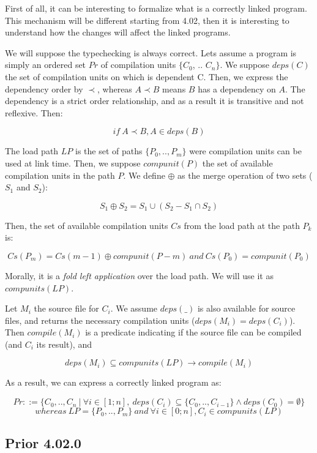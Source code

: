 \documentclass[11pt,a4paper]{article}
\begin{document}
First of all, it can be interesting to formalize what is a correctly linked
program. This mechanism will be different starting from 4.02, then it is
interesting to understand how the changes will affect the linked programs.

We will suppose the typechecking is always correct. Lets assume a program is
simply an ordered set $Pr$ of compilation units $\{C_0$, .. $C_n\}$. We suppose
$deps(C)$ the set of compilation units on which is dependent C. Then, we express
the dependency order by $\prec$, whereas $A \prec B$ means $B$ has a dependency
on $A$. The dependency is a strict order relationship, and as a result it is
transitive and not reflexive. Then:

$$if~ A \prec B, A \in deps(B)$$

The load path $LP$ is the set of paths $\{P_0, .., P_m\}$ were compilation units
can be used at link time. Then, we suppose $compunit(P)$ the set of available
compilation units in the path $P$. We define $\oplus$ as the merge operation of
two sets ($S_1$ and $S_2$):

$$S_1 \oplus S_2 = S_1 \cup (S_2 - S_1 \cap S_2) $$

Then, the set of available compilation units $Cs$ from the load path at the path
$P_k$ is: 

$$Cs(P_m) = Cs(m-1) \oplus compunit(P-m) ~and~ Cs(P_0) = compunit(P_0)$$

Morally, it is a \emph{fold left application} over the load path. We will use it
as $compunits(LP)$.

Let $M_i$ the source file for $C_i$. We assume $deps(\_)$ is also available for
source files, and returns the necessary compilation units ($deps(M_i) =
deps(C_i)$). Then $compile(M_i)$ is a predicate indicating if the source file
can be compiled (and $C_i$ its result), and

$$deps(M_i) \subseteq compunits(LP) \rightarrow compile(M_i)$$

As a result, we can express a correctly linked program as:

$$ Pr ::= \{ C_0, .., C_n ~|~ \forall i \in [1; n], ~deps(C_i) \subseteq \{ C_0, ..,
    C_{i-1} \} \land deps(C_0) = \emptyset \}$$
$$  whereas ~ LP = \{ P_0, .., P_m \}~and~\forall i \in [0; n], C_i \in compunits(LP)
$$

\subsection{Prior 4.02.0}
\end{document}
